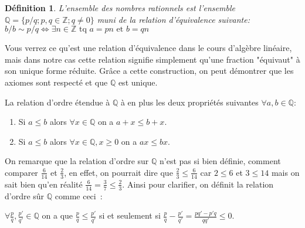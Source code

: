 \documentclass[a4paper, 12pt, french, twoside]{article}
\newtheorem{defi}[theorem]{Définition}
\newcommand{\Zz}{{\mathbb{Z}}}
\newcommand{\Qq}{{\mathbb{Q}}}
\begin{document}
\begin{tcolorbox}
   \begin{defi}
    L'ensemble des nombres rationnels est l'ensemble $\Qq=\{p/q; p,q\in \Zz; q\neq 0 \}$ muni de la relation d'équivalence suivante: 
    $b/b\sim p/q \iff \exists n\in \Zz \text{ tq } a=pn \text{ et } b=qn$
\end{defi}
Vous verrez ce qu'est une relation d'équivalence dans le cours d'algèbre linéaire, mais dans notre cas cette relation signifie simplement qu'une fraction "équivaut" à son unique forme réduite. Grâce a cette construction, on peut démontrer que les axiomes sont respecté et que $\Qq$ est unique. 



La relation d'ordre étendue à $\Qq$ à en plus les deux propriétés suivantes $\forall a,b \in \Qq$:  
\begin{enumerate}[label=\arabic*),resume]
    \item  Si $a\leq b$ alors $\forall x\in \Qq$ on a $a+x\leq b+x$.
    \item Si $a\leq b$ alors $\forall x\in \Qq, x\geq 0 $ on a $ax\leq bx$.
\end{enumerate}
On remarque que la relation d'ordre sur $\Qq$ n'est pas si bien définie, comment comparer $\frac{6}{14}$ et $\frac{2}{3}$, en effet, on pourrait dire que $\frac{2}{3}\leq \frac{6}{14} $ car $2\leq 6$ et $3\leq 14$ mais on sait bien qu'en réalité $\frac{6}{14}=\frac{3}{7}\leq \frac{2}{3}$. Ainsi pour clarifier, on définit la relation d'ordre sûr $\Qq$ comme ceci :
\begin{center}
    $\forall \frac{p}{q}, \frac{p'}{q'}\in \Qq$ on a que $\frac{p}{q}\leq \frac{p'}{q'}$ si et seulement si $\frac{p}{q}- \frac{p'}{q'}=\frac{pq'-p'q}{qq'}\leq 0$.
\end{center}


\end{tcolorbox}
\end{document}
